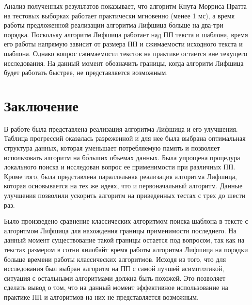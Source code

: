 \documentclass[14pt]{article}
\begin{document}
Анализ полученных результатов показывает, что алгоритм Кнута-Морриса-Пратта на тестовых выборках работает практически мгновенно (менее 1 мс), а время работы предложенной реализации алгоритма Лифшица больше на два-три порядка. Поскольку алгоритм Лифшица работает над ПП текста и шаблона, время его работы напрямую зависит от размера ПП и сжимаемости исходного текста и шаблона. Однако вопрос сжимаемости текстов на практике остается вне текущего исследования. На данный момент обозначить границы, когда алгоритм Лифшица будет работать быстрее, не представляется возможным.

\newpage
\section{Заключение}
В работе была представлена реализация алгоритма Лифшица и его улучшения. Таблица прогрессий оказалась разреженной и для нее была выбрана оптимальная структура данных, которая уменьшает потребляемую память и позволяет использовать алгоритм на б\'{о}льших объемах данных. Была упрощена процедура локального поиска и исследован вопрос ее применимости при различных ПП. Кроме того, была представлена параллельная реализация алгоритма Лифшица, которая основывается на тех же идеях, что и первоначальный алгоритм. Данные улучшения позволили ускорить алгоритм на приведенных тестах с трех до шести раз. 

Было произведено сравнение классических алгоритмом поиска шаблона в тексте с алгоритмом Лифшица для нахождения границы применимости последнего. На данный момент существование такой границы остается под вопросом, так как на текстах размером в сотни килобайт время работы алгоритма Лифшица на порядки больше времени работы классических алгоритмов. Исходя из того, что для исследования был выбран алгоритм на ПП с самой лучшей асимптотикой, ситуация с остальными алгоритмами должна быть похожей. Это позволяет сделать вывод о том, что на данный момент эффективное использование на практике ПП и алгоритмов на них не представляется возможным.
     
\end{document}
